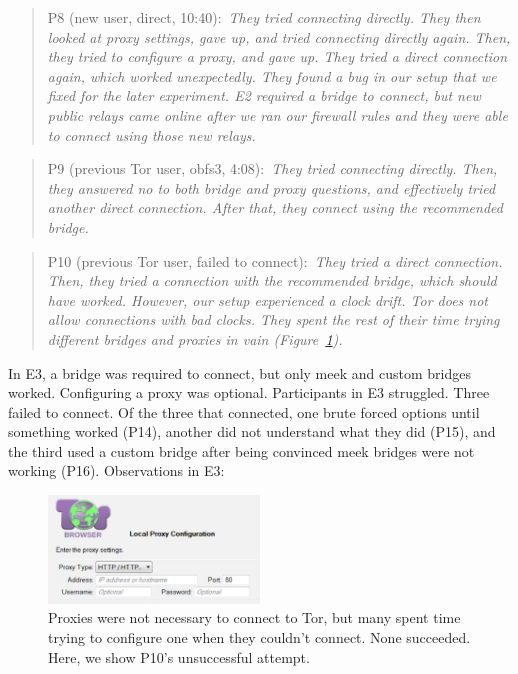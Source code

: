 \documentclass[USenglish,oneside,twocolumn]{article}
\newcommand{\pquote}[2]{
\begin{quotation}
\noindent #1:~\textit{#2}
\end{quotation}
}
\begin{document}
\pquote{P8 (new user, direct, 10:40)}{They tried connecting directly. They then looked at proxy settings, gave up, and tried connecting directly again. Then, they tried to configure a proxy, and gave up. They tried a direct connection again, which worked unexpectedly. They found a bug in our setup that we fixed for the later experiment. E2 required a bridge to connect, but new public relays came online after we ran our firewall rules and they were able to connect using those new relays. }

\pquote{P9 (previous Tor user, obfs3, 4:08)}{They tried connecting directly. Then, they answered no to both bridge and proxy questions, and effectively tried another direct connection. After that, they connect using the recommended bridge.}

\pquote{P10 (previous Tor user, failed to connect)}{They tried a direct connection. Then, they tried a connection with the recommended bridge, which should have worked. However, our setup experienced a clock drift. Tor does not allow connections with bad clocks. They spent the rest of their time trying different bridges and proxies in vain (Figure~\ref{fig:proxy-attempt}).}

In E3, a bridge was required to connect, but only meek and custom bridges worked. Configuring a proxy was optional.
Participants in E3 struggled. Three failed to connect. Of the three that connected, one brute forced options until something worked (P14), another did not understand what they did (P15), and the third used a custom bridge after being convinced meek bridges were not working (P16).
Observations in E3: 

\begin{figure}[t]
\centering
\includegraphics[width=0.5\textwidth]{P8-proxy-attempt.png}
\caption{
Proxies were not necessary to connect to Tor, but many spent time trying to configure one when they couldn't connect. None succeeded. Here, we show P10's unsuccessful attempt. 
}
\label{fig:proxy-attempt}
\end{figure}
\end{document}
